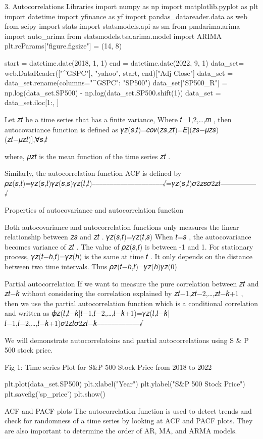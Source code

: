 3. Autocorrelations
Libraries
import numpy as np import matplotlib.pyplot as plt import datetime import yfinance as yf import pandas_datareader.data as web from scipy import stats import statsmodels.api as sm from pmdarima.arima import auto_arima from statsmodels.tsa.arima.model import ARIMA plt.rcParams["figure.figsize"] = (14, 8)

start = datetime.date(2018, 1, 1) end = datetime.date(2022, 9, 1) data_set= web.DataReader(["^GSPC"], "yahoo", start, end)["Adj Close"] data_set = data_set.rename(columns={"^GSPC": "SP500"}) data_set["SP500_R"] = np.log(data_set.SP500) - np.log(data_set.SP500.shift(1)) data_set = data_set.iloc[1:, ]

Let  {𝑧𝑡}  be a time series that has a finite variance, Where  𝑡=1,2,…,𝑚 , then autocovariance function is defined as
𝛾𝑧(𝑠,𝑡)=𝑐𝑜𝑣(𝑧𝑠,𝑧𝑡)=𝐸[(𝑧𝑠−𝜇𝑧𝑠)(𝑧𝑡−𝜇𝑧𝑡)],∀𝑠,𝑡
 
where,  𝜇𝑧𝑡  is the mean function of the time series  {𝑧𝑡} .

Similarly, the autocorrelation function ACF is defined by
𝜌𝑧(𝑠,𝑡)=𝛾𝑧(𝑠,𝑡)𝛾𝑧(𝑠,𝑠)𝛾𝑧(𝑡,𝑡)⎯⎯⎯⎯⎯⎯⎯⎯⎯⎯⎯⎯⎯⎯⎯⎯⎯⎯⎯⎯√=𝛾𝑧(𝑠,𝑡)𝜎2𝑧𝑠𝜎2𝑧𝑡⎯⎯⎯⎯⎯⎯⎯⎯⎯⎯√
 
Properties of autocovariance and autocorrelation function

Both autocovariance and autocorrelation functions only measures the linear relationship between  𝑧𝑠  and  𝑧𝑡 .
𝛾𝑧(𝑠,𝑡)=𝛾𝑧(𝑡,𝑠) 
When  𝑡=𝑠 , the autocovariance becomes variance of  𝑧𝑡 .
The value of  𝜌𝑧(𝑠,𝑡)  is between -1 and 1.
For stationary process,  𝛾𝑧(𝑡−ℎ,𝑡)=𝛾𝑧(ℎ)  is the same at time  𝑡 . It only depends on the distance between two time intervals. Thus
𝜌𝑧(𝑡−ℎ,𝑡)=𝛾𝑧(ℎ)𝛾𝑧(0)
 
Partial autocorrelation
If we want to measure the pure correlation between  𝑧𝑡  and  𝑧𝑡−𝑘  without considering the correlation explained by  𝑧𝑡−1,𝑧𝑡−2,…,𝑧𝑡−𝑘+1 , then we use the partial autocorrelation function which is a conditional correlation and written as
𝜙𝑧(𝑡,𝑡−𝑘|𝑡−1,𝑡−2,…,𝑡−𝑘+1)=𝛾𝑧(𝑡,𝑡−𝑘|𝑡−1,𝑡−2,…,𝑡−𝑘+1)𝜎2𝑧𝑡𝜎2𝑧𝑡−𝑘⎯⎯⎯⎯⎯⎯⎯⎯⎯⎯⎯⎯√
 
We will demonstrate autocorrelatoins and partial autocorrelations using S & P 500 stock price.

Fig 1: Time series Plot for S&P 500 Stock Price from 2018 to 2022

plt.plot(data_set.SP500)
plt.xlabel("Year")
plt.ylabel("S&P 500 Stock Price")
plt.savefig('sp_price')
plt.show()

ACF and PACF plots
The autocorrelation function is used to detect trends and check for randomness of a time series by looking at ACF and PACF plots. They are also important to determine the order of AR, MA, and ARMA models.

